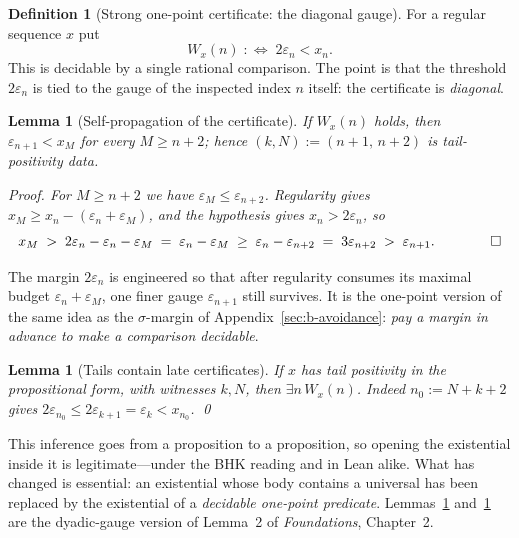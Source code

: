 \documentclass[11pt]{article}
\newtheorem{lemma}[theorem]{Lemma}
\theoremstyle{definition}
\newtheorem{definition}[theorem]{Definition}
\theoremstyle{remark}
\begin{document}
\begin{definition}[Strong one-point certificate: the diagonal gauge]
\label{def:b-certificate}
For a regular sequence $x$ put
\[
W_x(n)\;:\Longleftrightarrow\;2\varepsilon_n<x_n .
\]
This is decidable by a single rational comparison.  The point is that the threshold $2\varepsilon_n$ is tied to the gauge of the inspected index $n$ itself: the certificate is \emph{diagonal}.
\end{definition}

\begin{lemma}[Self-propagation of the certificate]
\label{lem:b-propagate}
If $W_x(n)$ holds, then $\varepsilon_{n+1}<x_M$ for every $M\ge n+2$; hence $(k,N):=(n+1,\,n+2)$ is tail-positivity data.

\emph{Proof.}  For $M\ge n+2$ we have $\varepsilon_M\le\varepsilon_{n+2}$.  Regularity gives $x_M\ge x_n-(\varepsilon_n+\varepsilon_M)$, and the hypothesis gives $x_n>2\varepsilon_n$, so
\[
x_M\;>\;2\varepsilon_n-\varepsilon_n-\varepsilon_M\;=\;\varepsilon_n-\varepsilon_M\;\ge\;\varepsilon_n-\varepsilon_{n+2}\;=\;3\varepsilon_{n+2}\;>\;\varepsilon_{n+1}. \qquad\qed
\]
\end{lemma}

The margin $2\varepsilon_n$ is engineered so that after regularity consumes its maximal budget $\varepsilon_n+\varepsilon_M$, one finer gauge $\varepsilon_{n+1}$ still survives.  It is the one-point version of the same idea as the $\sigma$-margin of Appendix~\ref{sec:b-avoidance}: \emph{pay a margin in advance to make a comparison decidable}.

\begin{lemma}[Tails contain late certificates]
\label{lem:b-late}
If $x$ has tail positivity in the propositional form, with witnesses $k,N$, then $\exists n\,W_x(n)$.  Indeed $n_0:=N+k+2$ gives $2\varepsilon_{n_0}\le 2\varepsilon_{k+1}=\varepsilon_k<x_{n_0}$. \qed
\end{lemma}

This inference goes from a proposition to a proposition, so opening the existential inside it is legitimate---under the BHK reading and in Lean alike.  What has changed is essential: an existential whose body contains a universal has been replaced by the existential of a \emph{decidable one-point predicate}.  Lemmas~\ref{lem:b-propagate} and~\ref{lem:b-late} are the dyadic-gauge version of Lemma~2 of \emph{Foundations}, Chapter~2.
\end{document}
